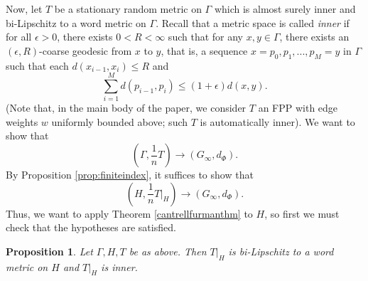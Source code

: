 \documentclass[12pt,reqno]{article}
\numberwithin{equation}{section}
\newtheorem{prop}{Proposition}
\begin{document}
Now, let $T$ be a stationary random metric on $\Gamma$ which is almost surely inner and bi-Lipschitz to a word metric on $\Gamma$.
Recall that a metric space is called \emph{inner} if for all $\epsilon > 0$, there exists $0<R<\infty$ such that
for any $x,y \in \Gamma$, there exists an $(\epsilon,R)$-coarse geodesic from $x$ to $y$,
that is, a sequence $x=p_0, p_1,...,p_M=y$ in $\Gamma$ such that each $d(x_{i-1},x_i) \le R$ and
\[
   \sum_{i=1}^M d(p_{i-1},p_i) \le (1+\epsilon)d(x,y).
\]
(Note that, in the main body of the paper, we consider $T$ an FPP with edge weights $w$ uniformly bounded above;
such $T$ is automatically inner). 
We want to show that
\[
   (\Gamma, \frac{1}{n} T) \to (G_{\infty}, d_{\Phi}).
\]
By Proposition \ref{prop:finiteindex}, it suffices to show that
\[
   (H, \frac{1}{n} T|_H) \to (G_{\infty}, d_{\Phi}).
\]
Thus, we want to apply Theorem \ref{cantrellfurmanthm} to $H$, so first we must check that the hypotheses are satisfied.
\begin{prop}
Let $\Gamma, H, T$ be as above. Then $T|_H$ is bi-Lipschitz to a word metric on $H$ and $T|_H$ is inner.
\end{prop}
\end{document}
